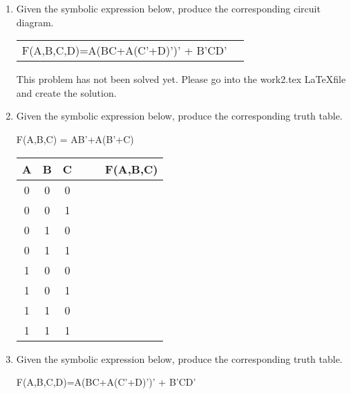 \begin{enumerate}
    \item Given the symbolic expression below, produce the corresponding circuit diagram.

        \begin{tabular}{lp{2in}}
            F(A,B,C,D)=A(BC+A(C'+D)')' + B'CD'  & \\
        \end{tabular}
        \begin{onlysolution}
            This problem has not been solved yet.  Please go into the work2.tex \LaTeX file and create the solution.
        \end{onlysolution}
        \vspace{3cm}

    \item Given the symbolic expression below, produce the corresponding truth table.

        F(A,B,C) = AB'+A(B'+C)

        \begin{tabular}{c|c|c|c|c||c}
            A & B & C &   &    &  F(A,B,C) \\ \hline \hline
            0 & 0 & 0 &   &    &    \\ \hline
            0 & 0 & 1 &   &    &    \\ \hline
            0 & 1 & 0 &   &    &    \\ \hline
            0 & 1 & 1 &   &    &    \\ \hline
            1 & 0 & 0 &   &    &    \\ \hline
            1 & 0 & 1 &   &    &    \\ \hline
            1 & 1 & 0 &   &    &    \\ \hline
            1 & 1 & 1 &   &    &    \\
        \end{tabular}

    \item Given the symbolic expression below, produce the corresponding truth table.

        F(A,B,C,D)=A(BC+A(C'+D)')' + B'CD'


\end{enumerate}
